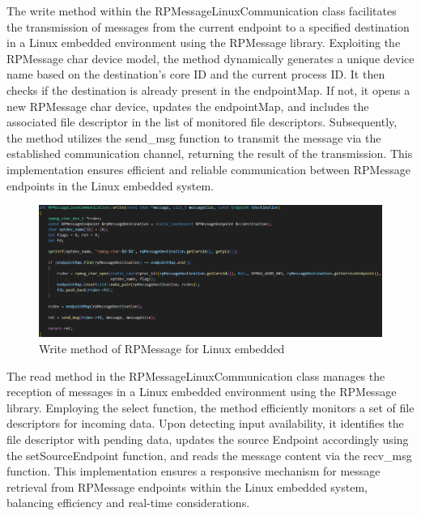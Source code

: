 The write method within the RPMessageLinuxCommunication class facilitates the
transmission of messages from the current endpoint to a specified destination
in a Linux embedded environment using the RPMessage library.
Exploiting the RPMessage char device model, the method dynamically generates a
unique device name based on the destination's core ID and the current process
ID. It then checks if the destination is already present in the endpointMap.
If not, it opens a new RPMessage char device, updates the endpointMap,
and includes the associated file descriptor in the list of monitored file
descriptors. Subsequently, the method utilizes the send\_msg function to
transmit the message via the established communication channel, returning the
result of the transmission.
This implementation ensures efficient and reliable communication between
RPMessage endpoints in the Linux embedded system.

\begin{figure}[H]
    \centering
    \includegraphics[width=1.0\textwidth]{Figures/implementation_rpmessage_linux_write.png}
    \caption{Write method of RPMessage for Linux embedded}
\end{figure}

The read method in the RPMessageLinuxCommunication class manages the reception
of messages in a Linux embedded environment using the RPMessage library.
Employing the select function, the method efficiently monitors a set of file
descriptors for incoming data. Upon detecting input availability, it identifies
the file descriptor with pending data, updates the source Endpoint accordingly
using the setSourceEndpoint function, and reads the message content via the
recv\_msg function.
This implementation ensures a responsive mechanism for message retrieval from
RPMessage endpoints within the Linux embedded system, balancing efficiency
and real-time considerations.

